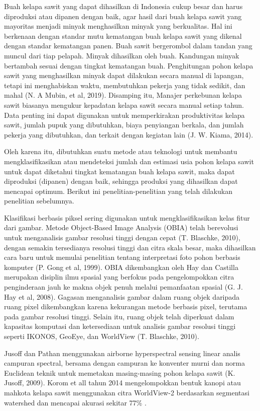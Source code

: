 Buah kelapa sawit yang dapat dihasilkan di Indonesia cukup besar dan harus diproduksi atau dipanen dengan baik, agar hasil dari buah kelapa sawit yang mayoritas menjadi minyak menghasilkan minyak yang berkualitas. Hal ini berkenaan dengan standar mutu kematangan buah kelapa sawit yang dikenal dengan standar kematangan panen. Buah sawit bergerombol dalam tandan yang muncul dari tiap pelapah. Minyak dihasilkan oleh buah. Kandungan minyak bertambah sesuai dengan tingkat kematangan buah. Penghitungan pohon kelapa sawit yang menghasilkan minyak dapat dilakukan secara manual di lapangan, tetapi ini menghabiskan waktu, membutuhkan pekerja yang tidak sedikit, dan mahal (N. A Mubin, et al, 2019). Disamping itu, Manajer perkebunan kelapa sawit biasanya mengukur kepadatan kelapa sawit secara manual setiap tahun. Data penting ini dapat digunakan untuk memperkirakan produktivitas kelapa sawit, jumlah pupuk yang dibutuhkan, biaya penyiangan berkala, dan jumlah pekerja yang dibutuhkan, dan terkait dengan kegiatan lain (J. W. Kiama, 2014).

Oleh karena itu, dibutuhkan suatu metode atau teknologi untuk membantu mengklasifikasikan atau mendeteksi jumlah dan estimasi usia pohon kelapa sawit untuk dapat diketahui tingkat kematangan buah kelapa sawit, maka dapat diproduksi (dipanen) dengan baik, sehingga produksi yang dihasilkan dapat mencapai optimum. Berikut ini penelitian-penelitian yang telah dilakukan penelitian sebelumnya.

Klasifikasi berbasis piksel sering digunakan untuk mengklasifikasikan kelas fitur dari gambar. Metode Object-Based Image Analysis (OBIA) telah berevolusi untuk menganalisis gambar resolusi tinggi dengan cepat (T. Blaschke, 2010), dengan semakin tersedianya resolusi tinggi dan citra skala besar, maka dihasilkan cara baru untuk memulai penelitian tentang interpretasi foto pohon berbasis komputer (P. Gong et al, 1999). OBIA dikembangkan oleh Hay dan Castilla merupakan disiplin ilmu spasial yang berfokus pada pengelompokkan citra penginderaan jauh ke makna objek penuh melalui pemanfaatan spasial (G. J. Hay et al, 2008). Gagasan menganalisis gambar dalam ruang objek daripada ruang pixel dikembangkan karena kekurangan metode berbasis pixel, terutama pada gambar resolusi tinggi. Selain itu, ruang objek telah diperkuat dalam kapasitas komputasi dan ketersediaan untuk analisis gambar resolusi tinggi seperti IKONOS, GeoEye, dan WorldView (T. Blaschke, 2010).

Jusoff dan Pathan menggunakan airborne hyperspectral sensing linear analis campuran spectral, bersama dengan campuran ke konventer murni dan norma Euclidean teknik untuk memetakan masing-masing pohon kelapa sawit (K. Jusoff, 2009). Korom et all tahun 2014 mengelompokkan bentuk kanopi atau mahkota kelapa sawit menggunakan citra WorldView-2 berdasarkan segmentasi watershed dan mencapai akurasi sekitar 77\% \citep{Korom2014-ci}.

